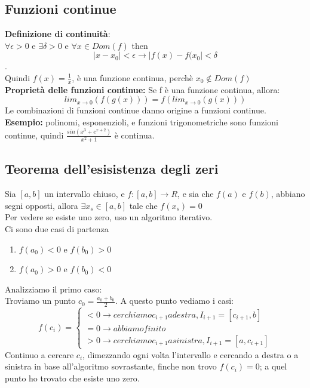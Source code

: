 \documentclass[11pt]{article}
\begin{document}
\subsection{Funzioni continue}
\textbf{Definizione di continuità}:\\
$\forall \epsilon > 0$ e $\exists \delta > 0$ e $\forall x \in Dom(f)$
then $$|x - x_{0}| < \epsilon \rightarrow |f(x) - f(x_{0}| < \delta$$.\\
Quindi $f(x) = \frac{1}{x}$, è una funzione continua, perchè $x_{0} \notin Dom(f)$\\
\textbf{Proprietà delle funzioni continue:} Se f è una funzione continua, allora: $$lim_{x \rightarrow 0}(f(g(x))) = f(lim_{x \rightarrow 0}(g(x)))$$
Le combinazioni di funzioni continue danno origine a funzioni continue. \\\textbf{Esempio:} polinomi, esponenzioli, e funzioni trigonometriche 
sono funzioni continue, quindi $\frac{sin(x^{3} + e^{x+2})}{x^{2}+1}$ è  continua.\\
\subsection{Teorema dell'esisistenza degli zeri}
Sia $[a,b]$ un intervallo chiuso, e $f: [a,b] \rightarrow R$, e sia che $f(a)$ e $f(b)$, abbiano segni opposti, 
allora $\exists x_{s} \in [a,b]$ tale che $f(x_{s}) = 0$\\
Per vedere se esiste uno zero, uso un algoritmo iterativo.\\
Ci sono due casi di partenza
\begin{enumerate}
    \item $f(a_{0}) < 0$ e $f(b_{0}) > 0$
    \item $f(a_{0}) > 0$ e $f(b_{0}) < 0$
\end{enumerate}
Analizziamo il primo caso:\\
Troviamo un punto $c_{0} = \frac{a_{0} + b_{0}}{2}$. A questo punto vediamo i casi:
\[
  f(c_{i})=\begin{cases}
               < 0 \rightarrow cerchiamo c_{i+1} a destra, I_{i+1} = [c_{i+1},b]\\
               = 0 \rightarrow abbiamo finito\\
               > 0 \rightarrow cerchiamo c_{i+1} a sinistra, I_{i+1} = [a,c_{i+1}]
            \end{cases}
\]
Continuo a cercare $c_{i}$, dimezzando ogni volta l'intervallo e cercando a destra o a sinistra in base all'algoritmo 
sovrastante, finche non trovo $f(c_{i}) = 0$; a quel punto ho trovato che esiste uno zero.\\
\end{document}
